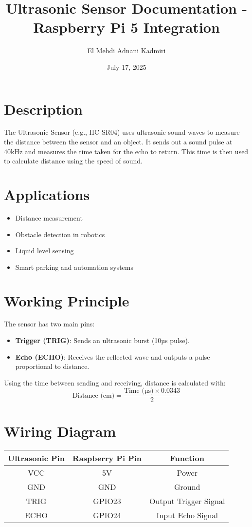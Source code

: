\documentclass{article}
\title{Ultrasonic Sensor Documentation - Raspberry Pi 5 Integration}
\author{El Mehdi Adnani Kadmiri}
\date{July 17, 2025}
\begin{document}
	
	\maketitle
	
	\section{Description}
	The Ultrasonic Sensor (e.g., HC-SR04) uses ultrasonic sound waves to measure the distance between the sensor and an object. It sends out a sound pulse at 40kHz and measures the time taken for the echo to return. This time is then used to calculate distance using the speed of sound.
	
	\section{Applications}
	\begin{itemize}
		\item Distance measurement
		\item Obstacle detection in robotics
		\item Liquid level sensing
		\item Smart parking and automation systems
	\end{itemize}
	
	\section{Working Principle}
	The sensor has two main pins:
	\begin{itemize}
		\item \textbf{Trigger (TRIG)}: Sends an ultrasonic burst (10µs pulse).
		\item \textbf{Echo (ECHO)}: Receives the reflected wave and outputs a pulse proportional to distance.
	\end{itemize}
	Using the time between sending and receiving, distance is calculated with:
	\[
	\text{Distance (cm)} = \frac{\text{Time (µs)} \times 0.0343}{2}
	\]
	
	\section{Wiring Diagram}
	\begin{center}
		\begin{tabular}{|c|c|c|}
			\hline
			\textbf{Ultrasonic Pin} & \textbf{Raspberry Pi Pin} & \textbf{Function} \\
			\hline
			VCC & 5V & Power \\
			GND & GND & Ground \\
			TRIG & GPIO23 & Output Trigger Signal \\
			ECHO & GPIO24 & Input Echo Signal \\
			\hline
		\end{tabular}
	\end{center}
	
\end{document}
